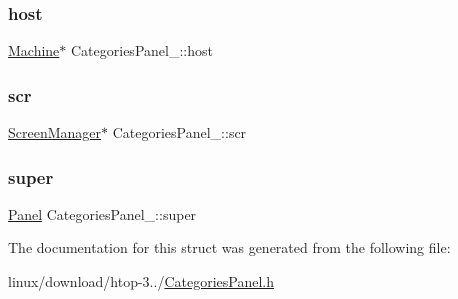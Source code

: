 \mbox{\label{structCategoriesPanel___a3af23ac869ef60bc8f9e162c1d641e61}} 
\subsubsection{\texorpdfstring{host}{host}}
{\footnotesize\ttfamily \hyperlink{Machine_8h_aa3706f95e4706b9d02979efcabb1341d}{Machine}$\ast$ Categories\+Panel\+\_\+\+::host}

\mbox{\label{structCategoriesPanel___a5f9e58d23e4782965dfa24832713464b}} 
\subsubsection{\texorpdfstring{scr}{scr}}
{\footnotesize\ttfamily \hyperlink{ScreenManager_8h_a798c9c69dc8024a4c6829982bf94dddd}{Screen\+Manager}$\ast$ Categories\+Panel\+\_\+\+::scr}

\mbox{\label{structCategoriesPanel___a7a23f2ac4e8cc310a81666b1d3746877}} 
\subsubsection{\texorpdfstring{super}{super}}
{\footnotesize\ttfamily \hyperlink{Panel_8h_a034d4c16521db412dc7a1e8536d16fae}{Panel} Categories\+Panel\+\_\+\+::super}



The documentation for this struct was generated from the following file\+:\begin{DoxyCompactItemize}
\item 
linux/download/htop-\/3../\hyperlink{CategoriesPanel_8h}{Categories\+Panel.\+h}\end{DoxyCompactItemize}
